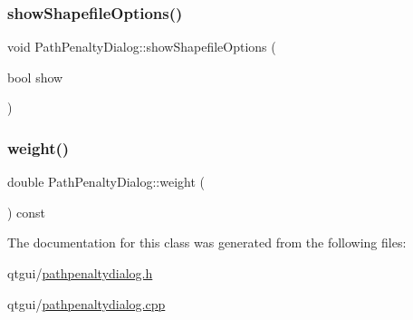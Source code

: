 \subsubsection{\texorpdfstring{showShapefileOptions()}{showShapefileOptions()}}
{\footnotesize\ttfamily void Path\+Penalty\+Dialog\+::show\+Shapefile\+Options (\begin{DoxyParamCaption}\item[{bool}]{show }\end{DoxyParamCaption})}

\mbox{\label{class_path_penalty_dialog_a581281d54ad59abaf75d3f7a6513e866}} 
\subsubsection{\texorpdfstring{weight()}{weight()}}
{\footnotesize\ttfamily double Path\+Penalty\+Dialog\+::weight (\begin{DoxyParamCaption}{ }\end{DoxyParamCaption}) const}



The documentation for this class was generated from the following files\+:\begin{DoxyCompactItemize}
\item 
qtgui/\mbox{\hyperlink{pathpenaltydialog_8h}{pathpenaltydialog.\+h}}\item 
qtgui/\mbox{\hyperlink{pathpenaltydialog_8cpp}{pathpenaltydialog.\+cpp}}\end{DoxyCompactItemize}
